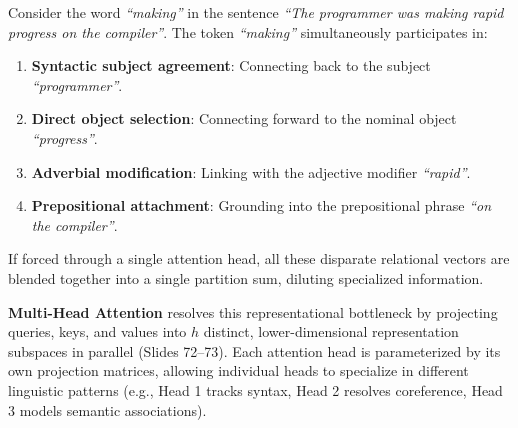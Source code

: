 \documentclass[../../main.tex]{subfiles}
\begin{document}
Consider the word \emph{``making''} in the sentence \emph{``The programmer was making rapid progress on the compiler''}. The token \emph{``making''} simultaneously participates in:
\begin{enumerate}
    \item \textbf{Syntactic subject agreement}: Connecting back to the subject \emph{``programmer''}.
    \item \textbf{Direct object selection}: Connecting forward to the nominal object \emph{``progress''}.
    \item \textbf{Adverbial modification}: Linking with the adjective modifier \emph{``rapid''}.
    \item \textbf{Prepositional attachment}: Grounding into the prepositional phrase \emph{``on the compiler''}.
\end{enumerate}
If forced through a single attention head, all these disparate relational vectors are blended together into a single partition sum, diluting specialized information.

\textbf{Multi-Head Attention} resolves this representational bottleneck by projecting queries, keys, and values into $h$ distinct, lower-dimensional representation subspaces in parallel (Slides 72--73). Each attention head is parameterized by its own projection matrices, allowing individual heads to specialize in different linguistic patterns (e.g., Head 1 tracks syntax, Head 2 resolves coreference, Head 3 models semantic associations).
\end{document}
